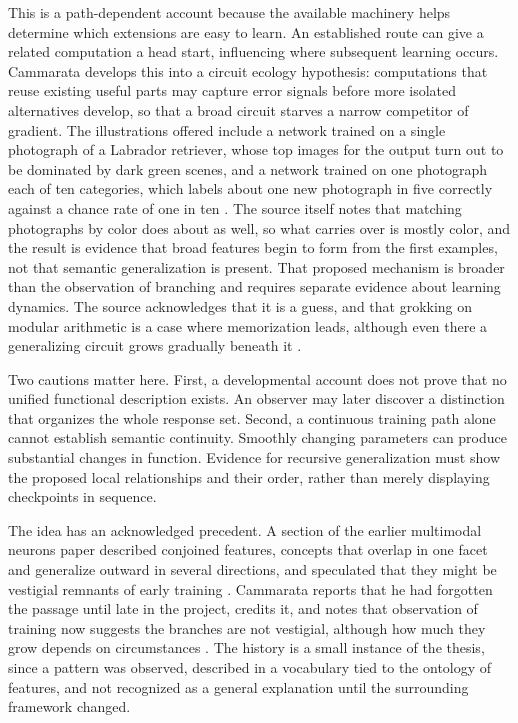\documentclass[11pt]{article}
\begin{document}
This is a path-dependent account because the available machinery helps determine which extensions are easy to learn. An established route can give a related computation a head start, influencing where subsequent learning occurs. Cammarata develops this into a circuit ecology hypothesis: computations that reuse existing useful parts may capture error signals before more isolated alternatives develop, so that a broad circuit starves a narrow competitor of gradient. The illustrations offered include a network trained on a single photograph of a Labrador retriever, whose top images for the output turn out to be dominated by dark green scenes, and a network trained on one photograph each of ten categories, which labels about one new photograph in five correctly against a chance rate of one in ten \cite[\emph{Why Networks Generalize}]{cammarata}. The source itself notes that matching photographs by color does about as well, so what carries over is mostly color, and the result is evidence that broad features begin to form from the first examples, not that semantic generalization is present. That proposed mechanism is broader than the observation of branching and requires separate evidence about learning dynamics. The source acknowledges that it is a guess, and that grokking on modular arithmetic is a case where memorization leads, although even there a generalizing circuit grows gradually beneath it \cite{nanda2023,pezeshki2021}.

Two cautions matter here. First, a developmental account does not prove that no unified functional description exists. An observer may later discover a distinction that organizes the whole response set. Second, a continuous training path alone cannot establish semantic continuity. Smoothly changing parameters can produce substantial changes in function. Evidence for recursive generalization must show the proposed local relationships and their order, rather than merely displaying checkpoints in sequence.

The idea has an acknowledged precedent. A section of the earlier multimodal neurons paper described conjoined features, concepts that overlap in one facet and generalize outward in several directions, and speculated that they might be vestigial remnants of early training \cite{goh2021}. Cammarata reports that he had forgotten the passage until late in the project, credits it, and notes that observation of training now suggests the branches are not vestigial, although how much they grow depends on circumstances \cite[\emph{Relation to Conjoined Features}]{cammarata}. The history is a small instance of the thesis, since a pattern was observed, described in a vocabulary tied to the ontology of features, and not recognized as a general explanation until the surrounding framework changed.
\end{document}
